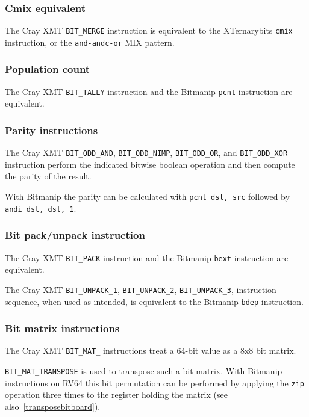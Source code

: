\subsubsection{Cmix equivalent}

The Cray XMT {\tt BIT\_MERGE} instruction is equivalent to the XTernarybits
{\tt cmix} instruction, or the {\tt and-andc-or} MIX pattern.

\subsubsection{Population count}

The Cray XMT {\tt BIT\_TALLY} instruction and the Bitmanip {\tt pcnt}
instruction are equivalent.

\subsubsection{Parity instructions}

The Cray XMT {\tt BIT\_ODD\_AND}, {\tt BIT\_ODD\_NIMP}, {\tt BIT\_ODD\_OR},
and {\tt BIT\_ODD\_XOR} instruction perform the indicated bitwise boolean
operation and then compute the parity of the result.

With Bitmanip the parity can be calculated with {\tt pcnt dst, src} followed
by {\tt andi dst, dst, 1}.

\subsubsection{Bit pack/unpack instruction}

The Cray XMT {\tt BIT\_PACK} instruction and the Bitmanip {\tt bext}
instruction are equivalent.

The Cray XMT {\tt BIT\_UNPACK\_1}, {\tt BIT\_UNPACK\_2}, {\tt BIT\_UNPACK\_3},
instruction sequence, when used as intended, is equivalent to the Bitmanip
{\tt bdep} instruction.

\subsubsection{Bit matrix instructions}

The Cray XMT {\tt BIT\_MAT\_} instructions treat a 64-bit value as a 8x8 bit
matrix.

{\tt BIT\_MAT\_TRANSPOSE} is used to transpose such a bit matrix. With
Bitmanip instructions on RV64 this bit permutation can be performed by
applying the {\tt zip} operation three times to the register holding the
matrix (see also~\ref{transposebitboard}).


